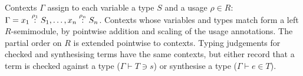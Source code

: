 Contexts $\Gamma$ assign to each variable a type $S$ and a usage
$\rho \in R$:
$\Gamma = \ctxvar{x_1}{S_1}{\rho_1}, \ldots,
\ctxvar{x_n}{S_n}{\rho_n}$.
Contexts whose variables and types match form a left $R$-semimodule,
by pointwise addition and scaling of the usage annotations. The
partial order on $R$ is extended pointwise to contexts.
Typing judgements for checked and synthesising terms have the same
contexts, but either record that a term is checked against a type
($\Gamma \vdash T \ni s$) or synthesise a type
($\Gamma \vdash e \in T$).

